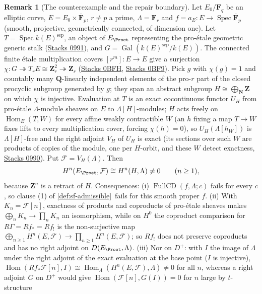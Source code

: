 \documentclass[11pt]{article}
\theoremstyle{plain}
\theoremstyle{definition}
\newtheorem{remark}[theorem]{Remark}
\newcommand{\Cref}[1]{\hyperref[#1]{\ref{#1}}\,\hyperref[#1]{\nameref*{#1}}}
\newcommand{\stacks}[1]{\href{https://stacks.math.columbia.edu/tag/#1}{Stacks #1}}
\begin{document}
\begin{remark}[The counterexample and the repair boundary]
\label{rem:sf-ambient-counterexample}
Let $E_0/\mathbf F_q$ be an elliptic curve, $E=E_0\times\overline{\mathbf
F}_p$, $r\ne p$ a prime, $\Lambda=\mathbf F_r$ and $f=a_E:E\to\operatorname{Spec}
\overline{\mathbf F}_p$ (smooth, projective, geometrically connected, of
dimension one).  Let $T=\operatorname{Spec}k(E)^{\mathrm{sep}}$, an object of
$E_{\Proet}$ representing the pro-\'etale geometric generic stalk
(\stacks{0991}), and $G=\operatorname{Gal}(k(E)^{\mathrm{sep}}/k(E))$.  The
connected finite \'etale multiplication covers $[r^m]:E\to E$ give a
surjection $\chi:G\twoheadrightarrow T_rE\cong\mathbf Z_r^2\twoheadrightarrow
\mathbf Z_r$ (\stacks{0BFH}, \stacks{0BF9}).  Pick $g$ with $\chi(g)=1$ and
countably many $\mathbf Q$-linearly independent elements of the pro-$r$ part
of the closed procyclic subgroup generated by $g$; they span an abstract
subgroup $H\cong\bigoplus_{\mathbf N}\mathbf Z$ on which $\chi$ is injective.
Evaluation at $T$ is an exact cocontinuous functor $U_H$ from pro-\'etale
$\Lambda$-module sheaves on $E$ to $\Lambda[H]$-modules; $H$ acts freely on
$\operatorname{Hom}_E(T,W)$ for every affine weakly contractible $W$ (an
$h$ fixing a map $T\to W$ fixes lifts to every multiplication cover, forcing
$\chi(h)=0$), so $U_H(\Lambda[h_W])$ is $\Lambda[H]$-free and the right
adjoint $V_H$ of $U_H$ is exact (its sections over such $W$ are products of
copies of the module, one per $H$-orbit, and these $W$ detect exactness,
\stacks{0990}).  Put $\mathcal F=V_H(\Lambda)$.  Then
\[
H^n(E_{\Proet},\mathcal F)\cong H^n(H,\Lambda)\ne0\qquad(n\ge1),
\]
because $\mathbf Z^n$ is a retract of $H$.  Consequences: (i)
$\operatorname{FullCD}(f,\Lambda;c)$ fails for every $c$, so clause (1) of
\Cref{def:sf-admissible} fails for this smooth proper $f$.  (ii) With
$K_n=\mathcal F[n]$, exactness of products and coproducts of pro-\'etale
sheaves makes $\bigoplus_nK_n\to\prod_nK_n$ an isomorphism, while on $H^0$ the
coproduct comparison for $R\Gamma=Rf_*=Rf_!$ is the non-surjective map
$\bigoplus_{n\ge1}H^n(E,\mathcal F)\to\prod_{n\ge1}H^n(E,\mathcal F)$; so
$Rf_!$ does not preserve coproducts and has no right adjoint on
$D(E_{\Proet},\Lambda)$.  (iii) Nor on $D^+$: with $I$ the image of
$\Lambda$ under the right adjoint of the exact evaluation at the base point
($I$ is injective), $\operatorname{Hom}(Rf_*\mathcal F[n],I)\cong
\operatorname{Hom}_\Lambda(H^n(E,\mathcal F),\Lambda)\ne0$ for all $n$,
whereas a right adjoint $G$ on $D^+$ would give
$\operatorname{Hom}(\mathcal F[n],G(I))=0$ for $n$ large by $t$-structure

\end{remark}
\end{document}
